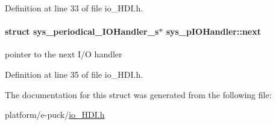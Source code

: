 Definition at line 33 of file io\+\_\+\+H\+D\+I.\+h.

\hypertarget{structsys__pIOHandler_a681bf25935fbdeb7a06a9f1dd47c9dff}{}
\paragraph[{next}]{\setlength{\rightskip}{0pt plus 5cm}struct sys\+\_\+periodical\+\_\+\+I\+O\+Handler\+\_\+s$\ast$ sys\+\_\+p\+I\+O\+Handler\+::next}\label{structsys__pIOHandler_a681bf25935fbdeb7a06a9f1dd47c9dff}
pointer to the next I/\+O handler 

Definition at line 35 of file io\+\_\+\+H\+D\+I.\+h.



The documentation for this struct was generated from the following file\+:\begin{DoxyCompactItemize}
\item 
platform/e-\/puck/\hyperlink{io__HDI_8h}{io\+\_\+\+H\+D\+I.\+h}\end{DoxyCompactItemize}
